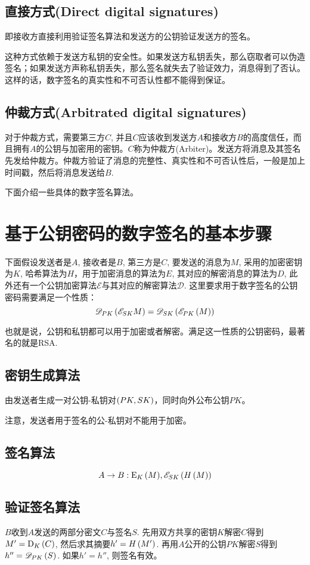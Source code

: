 \subsection{直接方式(Direct digital signatures)}
即接收方直接利用验证签名算法和发送方的公钥验证发送方的签名。\par
这种方式依赖于发送方私钥的安全性。如果发送方私钥丢失，那么窃取者可以伪造签名；如果发送方声称私钥丢失，那么签名就失去了验证效力，消息得到了否认。这样的话，数字签名的真实性和不可否认性都不能得到保证。
\subsection{仲裁方式(Arbitrated digital signatures)}
对于仲裁方式，需要第三方$C$, 并且$C$应该收到发送方$A$和接收方$B$的高度信任，而且拥有$A$的公钥与加密用的密钥。$C$称为仲裁方(Arbiter)。发送方将消息及其签名先发给仲裁方。仲裁方验证了消息的完整性、真实性和不可否认性后，一般是加上时间戳，然后将消息发送给$B$.\par
下面介绍一些具体的数字签名算法。
\section{基于公钥密码的数字签名的基本步骤}
下面假设发送者是$A$, 接收者是$B$, 第三方是$C$, 要发送的消息为$M$, 采用的加密密钥为$K$, 哈希算法为$H$，用于加密消息的算法为$E$, 其对应的解密消息的算法为$D$, 此外还有一个公钥加密算法$\mathscr{E}$与其对应的解密算法$\mathscr{D}$. 这里要求用于数字签名的公钥密码需要满足一个性质：
\[\mathscr{D}_{PK}\left( {\mathscr{E}_{SK}{M}}\right)=\mathscr{D}_{SK}\left( {\mathscr{E}_{PK}\left( {M}\right)}\right)\]

也就是说，公钥和私钥都可以用于加密或者解密。满足这一性质的公钥密码，最著名的就是RSA.
\subsection{密钥生成算法}
由发送者生成一对公钥-私钥对$\left( {PK, SK}\right)$，同时向外公布公钥$PK$。\par
注意，发送者用于签名的公-私钥对不能用于加密。
\subsection{签名算法}
\[A\to B:{\mathrm{E}_{K}\left({M}\right)},\mathscr{E}_{SK}\left( {H\left( {M}\right)}\right)\]
\subsection{验证签名算法}
$B$收到$A$发送的两部分密文$C$与签名$S$. 先用双方共享的密钥$K$解密$C$得到$M'={\mathrm{D}_{K}\left({C}\right)}$, 然后求其摘要$h'=H\left( {M'}\right)$. 再用$A$公开的公钥$PK$解密$S$得到$h''=\mathscr{D}_{PK}\left( {S}\right)$. 如果$h'=h''$, 则签名有效。
